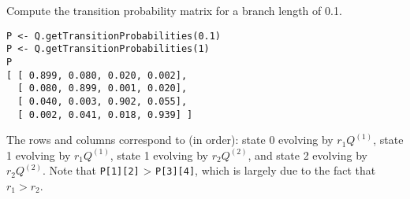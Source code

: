 Compute the transition probability matrix for a branch length of 0.1.

{\tt \begin{snugshade*}
\begin{lstlisting}
P <- Q.getTransitionProbabilities(0.1)
P <- Q.getTransitionProbabilities(1)
P
[ [ 0.899, 0.080, 0.020, 0.002],
  [ 0.080, 0.899, 0.001, 0.020],
  [ 0.040, 0.003, 0.902, 0.055],
  [ 0.002, 0.041, 0.018, 0.939] ]
\end{lstlisting}
\end{snugshade*}}

The rows and columns correspond to (in order): state 0 evolving by $r_1 Q^{(1)}$, state 1 evolving by $r_1 Q^{(1)}$, state 1 evolving by $r_2 Q^{(2)}$, and state 2 evolving by $r_2 Q^{(2)}$.
Note that {\tt P[1][2]} > {\tt P[3][4]}, which is largely due to the fact that $r_1 > r_2$.

\newpage
